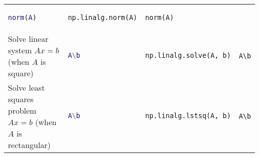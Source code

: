 \documentclass[]{article}
\begin{document}
\begin{longtable}[]{@{}llll@{}}
\begin{minipage}[t]{0.22\columnwidth}
\begin{lstlisting}[language=Matlab]
norm(A)
\end{lstlisting}
\strut
\end{minipage} & \begin{minipage}[t]{0.23\columnwidth}\raggedright\strut
\begin{lstlisting}[language=Python]
np.linalg.norm(A)
\end{lstlisting}
\strut
\end{minipage} & \begin{minipage}[t]{0.20\columnwidth}\raggedright\strut
\begin{lstlisting}
norm(A)
\end{lstlisting}
\strut
\end{minipage}\tabularnewline
\begin{minipage}[t]{0.23\columnwidth}\raggedright\strut
Solve linear system \(Ax=b\) (when \(A\) is square)\strut
\end{minipage} & \begin{minipage}[t]{0.22\columnwidth}\raggedright\strut
\begin{lstlisting}[language=Matlab]
A\b
\end{lstlisting}
\strut
\end{minipage} & \begin{minipage}[t]{0.23\columnwidth}\raggedright\strut
\begin{lstlisting}[language=Python]
np.linalg.solve(A, b)
\end{lstlisting}
\strut
\end{minipage} & \begin{minipage}[t]{0.20\columnwidth}\raggedright\strut
\begin{lstlisting}
A\b
\end{lstlisting}
\strut
\end{minipage}\tabularnewline
\begin{minipage}[t]{0.23\columnwidth}\raggedright\strut
Solve least squares problem \(Ax=b\) (when \(A\) is rectangular)\strut
\end{minipage} & \begin{minipage}[t]{0.22\columnwidth}\raggedright\strut
\begin{lstlisting}[language=Matlab]
A\b
\end{lstlisting}
\strut
\end{minipage} & \begin{minipage}[t]{0.23\columnwidth}\raggedright\strut
\begin{lstlisting}[language=Python]
np.linalg.lstsq(A, b)
\end{lstlisting}
\strut
\end{minipage} & \begin{minipage}[t]{0.20\columnwidth}\raggedright\strut
\begin{lstlisting}
A\b
\end{lstlisting}
\strut
\end{minipage}\tabularnewline
\bottomrule
\end{longtable}
\end{document}
